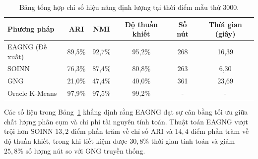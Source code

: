 \begin{table}[htbp]
    \centering
    \caption{Bảng tổng hợp chỉ số hiệu năng định lượng tại thời điểm mẫu thứ $3000$.}
    \label{tab:metrics_summary}
    \begin{tabular}{|l|c|c|c|c|c|}
        \hline
        Phương pháp & ARI & NMI & Độ thuần khiết & Số nút & Thời gian (giây) \\
        \hline
        EAGNG (Đề xuất) & 89,5\% & 92,7\% & 95,2\% & 268 & 16,39 \\
        SOINN \cite{furao2006soinn} & 76,3\% & 87,4\% & 80,8\% & 263 & 6,30 \\
        GNG \cite{fritzke1995growing} & 21,0\% & 47,4\% & 40,0\% & 361 & 23,69 \\
        Oracle K-Means \cite{macqueen1967methods} & 97,9\% & 97,5\% & 99,2\% & - & - \\
        \hline
    \end{tabular}
\end{table}

Các số liệu trong Bảng~\ref{tab:metrics_summary} khẳng định rằng EAGNG đạt sự cân bằng tối ưu giữa chất lượng phân cụm và chi phí tài nguyên tính toán. Thuật toán EAGNG vượt trội hơn SOINN $13{,}2$ điểm phần trăm về chỉ số ARI và $14{,}4$ điểm phần trăm về độ thuần khiết, trong khi tiết kiệm được $30{,}8\%$ thời gian tính toán và giảm $25{,}8\%$ số lượng nút so với GNG truyền thống.